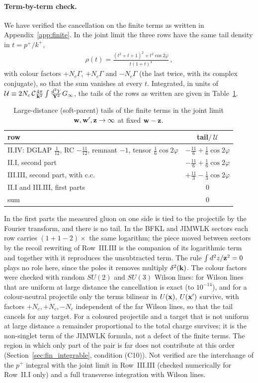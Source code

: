 \paragraph{Term-by-term check.} We have verified the cancellation on the finite terms as written in Appendix~\ref{app:finite}. In the joint limit the three rows have the same tail density in $t=p^+/k^+$,
\begin{align}\label{eq:dg_taildens}
\rho(t)=\frac{(t^2+t+1)^2+t^2\cos2\varphi}{t(1+t)^4}\,,
\end{align}
with colour factors $+N_c\Gamma$, $+N_c\Gamma$ and $-N_c\Gamma$ (the last twice, with its complex conjugate), so that the sum vanishes at every $t$. Integrated, in units of $\mathcal U\equiv2N_c\,\mathcal C\frac{4\pi}{\mathbf{k}^2}\int\frac{d^2Y}{\mathbf{Y}^2}G_\infty$, the tails of the rows as written are given in Table~\ref{tab:tails}.
\begin{table}[h]\centering
\begin{tabular}{lc}\hline
row & tail$/\,\mathcal U$\\\hline
II.IV: DGLAP $\frac1{12}$, RC $-\frac{11}{12}$, remnant $-1$, tensor $\frac16\cos2\varphi$ & $-\frac{11}{6}+\frac16\cos2\varphi$\\
II.I, second part & $-\frac{11}{6}+\frac16\cos2\varphi$\\
III.III, second part, with c.c. & $+\frac{11}{3}-\frac13\cos2\varphi$\\
II.I and III.III, first parts & $0$\\\hline
sum & $0$\\\hline
\end{tabular}
\caption{Large-distance (soft-parent) tails of the finite terms in the joint limit $\mathbf{w},\mathbf{w}',\mathbf{z}\to\infty$ at fixed $\mathbf{w}-\mathbf{z}$.}\label{tab:tails}
\end{table}
In the first parts the measured gluon on one side is tied to the projectile by the Fourier transform, and there is no tail. In the BFKL and JIMWLK sectors each row carries $(1+1-2)\times$ the same logarithm; the piece moved between sectors by the recoil rewriting of Row~III.III is the companion of its logarithmic term and together with it reproduces the unsubtracted term. The rule $\int d^2z/\mathbf{z}^2=0$ plays no role here, since the poles it removes multiply $\delta^2(\mathbf{k})$. The colour factors were checked with random $SU(2)$ and $SU(3)$ Wilson lines: for Wilson lines that are uniform at large distance the cancellation is exact (to $10^{-14}$), and for a colour-neutral projectile only the terms bilinear in $U(\mathbf{x})$, $U(\mathbf{x}')$ survive, with factors $+N_c,+N_c,-N_c$ independent of the far Wilson lines, so that the tail cancels for any target. For a coloured projectile and a target that is not uniform at large distance a remainder proportional to the total charge survives; it is the non-singlet term of the JIMWLK formula, not a defect of the finite terms. The region in which only part of the pair is far does not contribute at this order (Section~\ref{sec:fin_integrable}, condition (C10)). Not verified are the interchange of the $p^+$ integral with the joint limit in Row~III.III (checked numerically for Row~II.I only) and a full transverse integration with Wilson lines.
